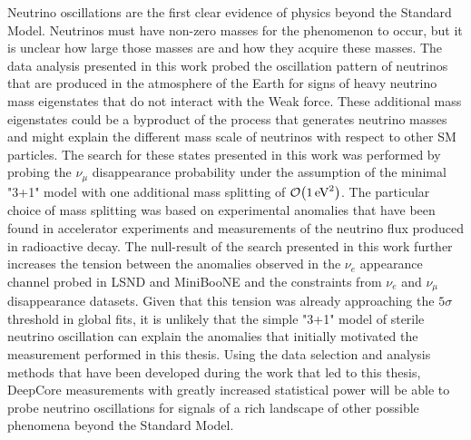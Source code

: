 Neutrino oscillations are the first clear evidence of physics beyond the Standard Model. Neutrinos must have non-zero masses for the phenomenon to occur, but it is unclear how large those masses are and how they acquire these masses. The data analysis presented in this work probed the oscillation pattern of neutrinos that are produced in the atmosphere of the Earth for signs of heavy neutrino mass eigenstates that do not interact with the Weak force. These additional mass eigenstates could be a byproduct of the process that generates neutrino masses and might explain the different mass scale of neutrinos with respect to other SM particles. The search for these states presented in this work was performed by probing the $\nu_\mu$ disappearance probability under the assumption of the minimal "3+1" model with one additional mass splitting of $\order{\SI{1}{\electronvolt\squared}}$. The particular choice of mass splitting was based on experimental anomalies that have been found in accelerator experiments and measurements of the neutrino flux produced in radioactive decay. The null-result of the search presented in this work further increases the tension between the anomalies observed in the $\nu_e$ appearance channel probed in LSND and MiniBooNE and the constraints from $\nu_e$ and $\nu_\mu$ disappearance datasets. Given that this tension was already approaching the $5\sigma$ threshold in global fits, it is unlikely that the simple "3+1" model of sterile neutrino oscillation can explain the anomalies that initially motivated the measurement performed in this thesis. Using the data selection and analysis methods that have been developed during the work that led to this thesis, DeepCore measurements with greatly increased statistical power will be able to probe neutrino oscillations for signals of a rich landscape of other possible phenomena beyond the Standard Model.
